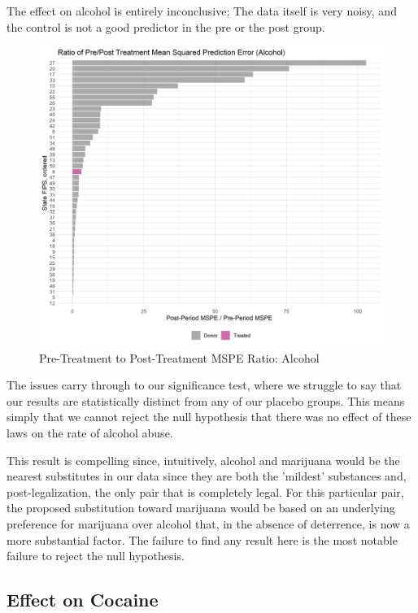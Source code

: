 \documentclass{article}
\begin{document}
The effect on alcohol is entirely inconclusive; The data itself is very noisy, and the control is not a good predictor in the pre or the post group.

\begin{figure}[H]
    \begin{center}
        \includegraphics[width=.85\textwidth]{Figure_MSPERat_Alcohol.png}
    \end{center}
    \caption{Pre-Treatment to Post-Treatment MSPE Ratio: Alcohol}
    \label{fig:AlcMSPER}
\end{figure}

The issues carry through to our significance test, where we struggle to say that our results are statistically distinct from any of our placebo groups. This means simply that we cannot reject the null hypothesis that there was no effect of these laws on the rate of alcohol abuse.

This result is compelling since, intuitively, alcohol and marijuana would be the nearest substitutes in our data since they are both the 'mildest' substances and, post-legalization, the only pair that is completely legal. For this particular pair, the proposed substitution toward marijuana would be based on an underlying preference for marijuana over alcohol that, in the absence of deterrence, is now a more substantial factor. The failure to find any result here is the most notable failure to reject the null hypothesis.

\subsection*{Effect on Cocaine}
\end{document}
